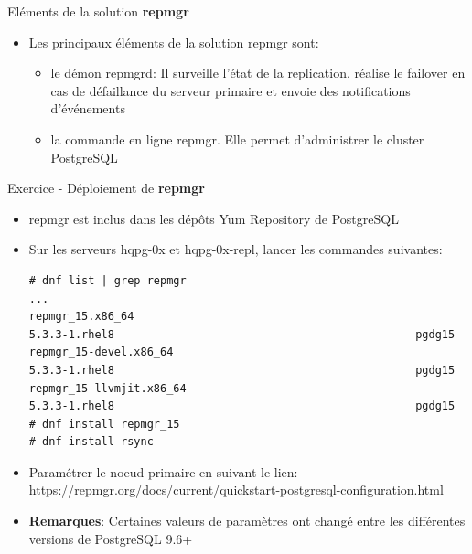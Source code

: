 
\begin{frame}[fragile]{Eléments de la solution \textbf{repmgr}}

   \begin{itemize}
      \item Les principaux éléments de la solution repmgr sont:
      \begin{itemize}
         \item le démon repmgrd: Il surveille l'état de la replication, réalise le failover en cas de défaillance du serveur primaire et envoie des notifications d'événements
         \item la commande en ligne repmgr. Elle permet d'administrer le cluster PostgreSQL
      \end{itemize}
   \end{itemize}

\end{frame}


\begin{frame}[fragile]{Exercice - Déploiement de \textbf{repmgr}}

   \begin{itemize}
      \item repmgr est inclus dans les dépôts Yum Repository de PostgreSQL
      \item Sur les serveurs hqpg-0x et hqpg-0x-repl, lancer les commandes suivantes:
\begin{tiny}
\begin{Verbatim}[commandchars=\\\{\}]
# dnf list | grep repmgr
...
repmgr_15.x86_64                                                  5.3.3-1.rhel8                                              pgdg15       
repmgr_15-devel.x86_64                                            5.3.3-1.rhel8                                              pgdg15       
repmgr_15-llvmjit.x86_64                                          5.3.3-1.rhel8                                              pgdg15
# dnf install repmgr_15
# dnf install rsync
\end{Verbatim}
\end{tiny}
      \item Paramétrer le noeud primaire en suivant le lien: https://repmgr.org/docs/current/quickstart-postgresql-configuration.html
      \item \textbf{Remarques}: Certaines valeurs de paramètres ont changé entre les différentes versions de PostgreSQL 9.6+
   \end{itemize}

\end{frame}

